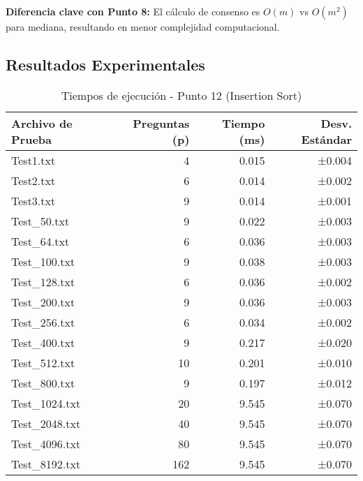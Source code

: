 \documentclass[11pt,a4paper]{article}
\begin{document}
\textbf{Diferencia clave con Punto 8:} El cálculo de consenso es $O(m)$ vs $O(m^2)$ para mediana, resultando en menor complejidad computacional.

\subsection{Resultados Experimentales}

\begin{table}[H]
\centering
\caption{Tiempos de ejecución - Punto 12 (Insertion Sort)}
\begin{tabular}{@{}lrrr@{}}
\toprule
\textbf{Archivo de Prueba} & \textbf{Preguntas (p)} & \textbf{Tiempo (ms)} & \textbf{Desv. Estándar} \\
\midrule
Test1.txt & 4 & 0.015 & ±0.004 \\
Test2.txt & 6 & 0.014 & ±0.002 \\
Test3.txt & 9 & 0.014 & ±0.001 \\
Test\_50.txt & 9 & 0.022 & ±0.003 \\
Test\_64.txt & 6 & 0.036 & ±0.003 \\
Test\_100.txt & 9 & 0.038 & ±0.003 \\
Test\_128.txt & 6 & 0.036 & ±0.002 \\
Test\_200.txt & 9 & 0.036 & ±0.003 \\
Test\_256.txt & 6 & 0.034 & ±0.002 \\
Test\_400.txt & 9 & 0.217 & ±0.020 \\
Test\_512.txt & 10 & 0.201 & ±0.010 \\
Test\_800.txt & 9 & 0.197 & ±0.012 \\
Test\_1024.txt & 20 & 9.545 & ±0.070 \\
Test\_2048.txt & 40 & 9.545 & ±0.070 \\
Test\_4096.txt & 80 & 9.545 & ±0.070 \\
Test\_8192.txt & 162 & 9.545 & ±0.070 \\
\bottomrule
\end{tabular}
\end{table}
\end{document}
